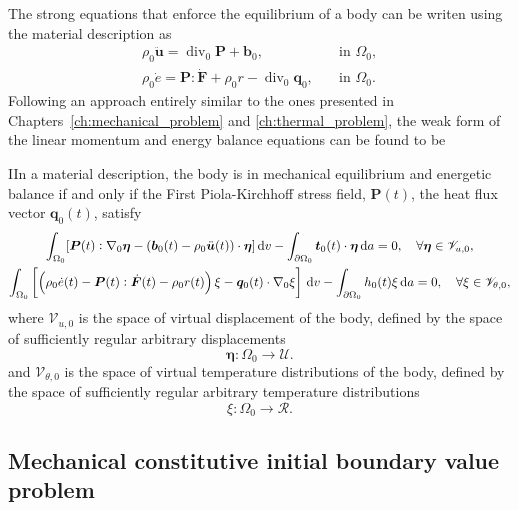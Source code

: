 The strong equations that enforce the equilibrium of a body can be writen using the material description as
\begin{align}
  \rho_0 \ddot{\bm u} = \operatorname{div}_0\bm P + \bm b_0, \quad & \text{in $\Omega_0$},\\
   \rho_0 \dot e = \bm P :\dot{\bm F} + \rho_0 r -\operatorname{div}_0 \bm q_0, \quad & \text{in  $\Omega_0$}.
\end{align}
Following an approach entirely similar to the ones presented in Chapters~\ref{ch:mechanical_problem} and \ref{ch:thermal_problem}, the weak form of the linear momentum and energy balance equations can be found to be
\begin{problem}
IIn a material description, the body is in mechanical equilibrium and energetic balance if and only if the First Piola-Kirchhoff stress field, \(\bm P(t)\), the heat flux vector \(\bm q_0(t)\), satisfy
    \begin{gather}
        \int_{\Omega_0} [\bm{P}(t):\nabla_0 \bm \eta - (\bm b_0(t) - \rho_0 \ddot{\bm u}(t))\cdot \bm \eta]\,\mathrm{d} v - \int_{\partial\Omega_0} \bm t_0(t)\cdot \bm \eta\,\mathrm{d} a = 0,\quad \forall \bm \eta \in \mathscr{V}_{u,0},\\
          \int_{\Omega_0}   \left[\left(\rho_0\dot e (t)- \bm P(t):\dot{\bm F}(t)- \rho_0r(t)\right) \xi - \bm q_0(t)\cdot \nabla_0 \xi\right]\,\mathrm{d} v - \int_{\partial\Omega_0} h_0(t) \xi\,\mathrm{d} a = 0,\quad \forall \xi \in \mathscr{V}_{\theta,0},
    \end{gather}
 where $\mathscr{V}_{u,0}$ is the space of virtual displacement of the body, defined by the space of sufficiently regular arbitrary displacements
 \begin{equation}
     \bm \eta\colon \Omega_0\to \mathscr{U}.
 \end{equation}
 and  $\mathscr{V}_{\theta,0}$ is the space of virtual temperature distributions of the body, defined by the space of sufficiently regular arbitrary temperature distributions
 \begin{equation}
     \xi\colon \Omega_0\to \mathscr R.
 \end{equation}
\end{problem}

\subsection{Mechanical constitutive initial boundary value problem}

